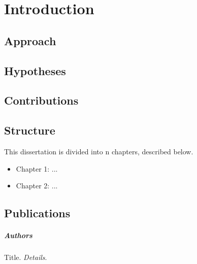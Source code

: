 
\chapter{Introduction}
\label{sec:introduction}



\section{Approach}



\section{Hypotheses}


\section{Contributions}


\section{Structure}

This dissertation is divided into n chapters, described below.
\begin{itemize}
\item Chapter 1: ...
\item Chapter 2: ...
\end{itemize}

\newpage
\section{Publications}

\paragraph{Authors}
Title. \emph{Details}. \citep{citationKey}